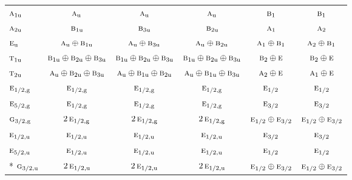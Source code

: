 \documentclass[10pt,a4paper]{article}
\numberwithin{equation}{section}
\newcommand{\irr}[1]{\text{\normalfont\scshape #1}}
\newcommand{\ptag}[1]{\mathrm{#1}}
\begin{document}
{\begin{longtable}{@{}lccccc@{}}
$\irr{a}_{1\ptag{u}}$ & $\irr{a}_{\ptag{u}}$ & $\irr{a}_{\ptag{u}}$ & $\irr{a}_{\ptag{u}}$ & $\irr{b}_{1}$ & $\irr{b}_{1}$\\
$\irr{a}_{2\ptag{u}}$ & $\irr{b}_{1\ptag{u}}$ & $\irr{b}_{3\ptag{u}}$ & $\irr{b}_{2\ptag{u}}$ & $\irr{a}_{1}$ & $\irr{a}_{2}$\\
$\irr{e}_{\ptag{u}}$ & $\irr{a}_{\ptag{u}}\oplus \irr{b}_{1\ptag{u}}$ & $\irr{a}_{\ptag{u}}\oplus \irr{b}_{3\ptag{u}}$ & $\irr{a}_{\ptag{u}}\oplus \irr{b}_{2\ptag{u}}$ & $\irr{a}_{1}\oplus \irr{b}_{1}$ & $\irr{a}_{2}\oplus \irr{b}_{1}$\\
$\irr{t}_{1\ptag{u}}$ & $\irr{b}_{1\ptag{u}}\oplus \irr{b}_{2\ptag{u}}\oplus \irr{b}_{3\ptag{u}}$ & $\irr{b}_{1\ptag{u}}\oplus \irr{b}_{2\ptag{u}}\oplus \irr{b}_{3\ptag{u}}$ & $\irr{b}_{1\ptag{u}}\oplus \irr{b}_{2\ptag{u}}\oplus \irr{b}_{3\ptag{u}}$ & $\irr{b}_{2}\oplus \irr{e}$ & $\irr{b}_{2}\oplus \irr{e}$\\
$\irr{t}_{2\ptag{u}}$ & $\irr{a}_{\ptag{u}}\oplus \irr{b}_{2\ptag{u}}\oplus \irr{b}_{3\ptag{u}}$ & $\irr{a}_{\ptag{u}}\oplus \irr{b}_{1\ptag{u}}\oplus \irr{b}_{2\ptag{u}}$ & $\irr{a}_{\ptag{u}}\oplus \irr{b}_{1\ptag{u}}\oplus \irr{b}_{3\ptag{u}}$ & $\irr{a}_{2}\oplus \irr{e}$ & $\irr{a}_{1}\oplus \irr{e}$\\
$\irr{e}_{1/2,\ptag{g}}$ & $\irr{e}_{1/2,\ptag{g}}$ & $\irr{e}_{1/2,\ptag{g}}$ & $\irr{e}_{1/2,\ptag{g}}$ & $\irr{e}_{1/2}$ & $\irr{e}_{1/2}$\\
$\irr{e}_{5/2,\ptag{g}}$ & $\irr{e}_{1/2,\ptag{g}}$ & $\irr{e}_{1/2,\ptag{g}}$ & $\irr{e}_{1/2,\ptag{g}}$ & $\irr{e}_{3/2}$ & $\irr{e}_{3/2}$\\
$\irr{g}_{3/2,\ptag{g}}$ & $2\,\irr{e}_{1/2,\ptag{g}}$ & $2\,\irr{e}_{1/2,\ptag{g}}$ & $2\,\irr{e}_{1/2,\ptag{g}}$ & $\irr{e}_{1/2}\oplus \irr{e}_{3/2}$ & $\irr{e}_{1/2}\oplus \irr{e}_{3/2}$\\
$\irr{e}_{1/2,\ptag{u}}$ & $\irr{e}_{1/2,\ptag{u}}$ & $\irr{e}_{1/2,\ptag{u}}$ & $\irr{e}_{1/2,\ptag{u}}$ & $\irr{e}_{3/2}$ & $\irr{e}_{3/2}$\\
$\irr{e}_{5/2,\ptag{u}}$ & $\irr{e}_{1/2,\ptag{u}}$ & $\irr{e}_{1/2,\ptag{u}}$ & $\irr{e}_{1/2,\ptag{u}}$ & $\irr{e}_{1/2}$ & $\irr{e}_{1/2}$\\*
$\irr{g}_{3/2,\ptag{u}}$ & $2\,\irr{e}_{1/2,\ptag{u}}$ & $2\,\irr{e}_{1/2,\ptag{u}}$ & $2\,\irr{e}_{1/2,\ptag{u}}$ & $\irr{e}_{1/2}\oplus \irr{e}_{3/2}$ & $\irr{e}_{1/2}\oplus \irr{e}_{3/2}$\\
\bottomrule\end{longtable}}
\end{document}
